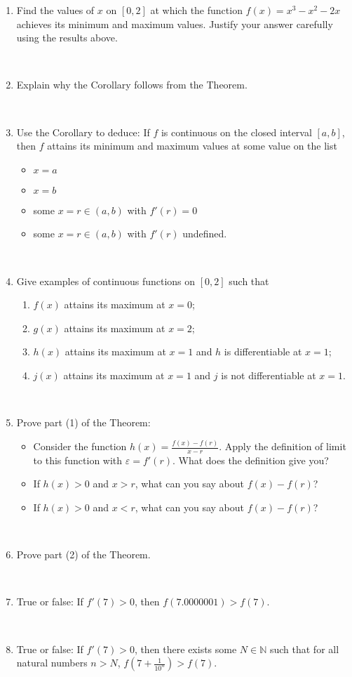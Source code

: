 \documentclass[12pt]{amsart}
\newcommand{\N}{\mathbb{N}}
\newcommand{\e}{\varepsilon}
\newcommand{\ds}{\displaystyle}
\begin{document}
 \begin{enumerate}
 
 \item Find the values of $x$ on $[0,2]$ at which the function $f(x) = x^3-x^2-2x$ achieves its minimum and maximum values. Justify your answer carefully using the results above.
 
 \ 
 
 \item Explain why the Corollary follows from the Theorem.
 
 \
 
 \item Use the Corollary to deduce: If $f$ is continuous on the closed interval $[a,b]$, then $f$ attains its minimum and maximum values at some value on the list
\begin{itemize}
\item $x=a$
\item $x=b$
\item some $x=r\in (a,b)$ with $f'(r)=0$
\item some $x=r\in (a,b)$ with $f'(r)$ undefined.
\end{itemize}

\
 
 \item Give examples of continuous functions on $[0,2]$ such that
 \begin{enumerate}
 \item $f(x)$ attains its maximum at $x=0$;
 \item $g(x)$ attains its maximum at $x=2$;
 \item $h(x)$ attains its maximum at $x=1$ and $h$ is differentiable at $x=1$;
 \item $j(x)$ attains its maximum at $x=1$ and $j$ is not differentiable at $x=1$.
 \end{enumerate}
 
 \
 
 \item Prove part (1) of the Theorem:
 \begin{itemize}
 \item Consider the function $\ds h(x) = \frac{ f(x) - f(r) }{x-r}$. Apply the definition of limit to this function with $\e = f'(r)$. What does the definition give you?
 \item If $h(x) > 0$ and $x>r$, what can you say about $f(x) - f(r)$?
  \item If $h(x) > 0$ and $x<r$, what can you say about $f(x) - f(r)$?
  \end{itemize}


\

 \item Prove part (2) of the Theorem.
 
 \
 
 \item True or false: If $f'(7)>0$, then $f(7.0000001)>f(7)$.
 
 \
 
  \item True or false: If $f'(7)>0$, then there exists some $N\in \N$ such that for all natural numbers $n>N$,  $f\left(7+ \frac{1}{10^n}\right)>f(7)$.

 
\end{enumerate}
\end{document}

